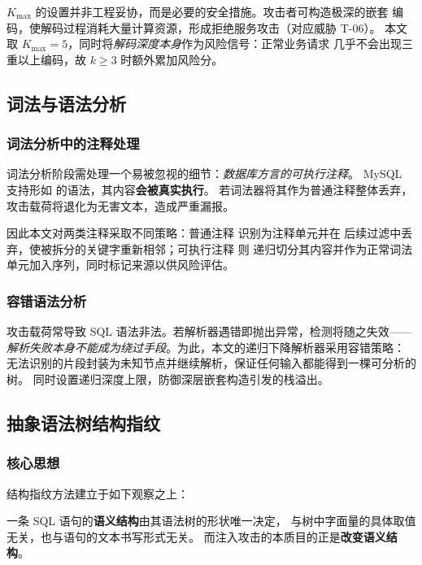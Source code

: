 \begin{remark}[解码深度上限的必要性]
$K_{\max}$ 的设置并非工程妥协，而是必要的安全措施。攻击者可构造极深的嵌套
编码，使解码过程消耗大量计算资源，形成拒绝服务攻击（对应威胁 T-06）。
本文取 $K_{\max} = 5$，同时将\emph{解码深度本身}作为风险信号：正常业务请求
几乎不会出现三重以上编码，故 $k \geq 3$ 时额外累加风险分。
\end{remark}

\subsection{词法与语法分析}
\label{subsec:parsing}

\subsubsection{词法分析中的注释处理}

词法分析阶段需处理一个易被忽视的细节：\emph{数据库方言的可执行注释}。
MySQL 支持形如  的语法，其内容\textbf{会被真实执行}。
若词法器将其作为普通注释整体丢弃，攻击载荷将退化为无害文本，造成严重漏报。

因此本文对两类注释采取不同策略：普通注释  识别为注释单元并在
后续过滤中丢弃，使被拆分的关键字重新相邻；可执行注释  则
递归切分其内容并作为正常词法单元加入序列，同时标记来源以供风险评估。

\subsubsection{容错语法分析}

攻击载荷常导致 SQL 语法非法。若解析器遇错即抛出异常，检测将随之失效——
\emph{解析失败本身不能成为绕过手段}。为此，本文的递归下降解析器采用容错策略：
无法识别的片段封装为未知节点并继续解析，保证任何输入都能得到一棵可分析的树。
同时设置递归深度上限，防御深层嵌套构造引发的栈溢出。

\subsection{抽象语法树结构指纹}
\label{subsec:fingerprint}

\subsubsection{核心思想}

结构指纹方法建立于如下观察之上：

\begin{keybox}
一条 SQL 语句的\textbf{语义结构}由其语法树的形状唯一决定，
与树中字面量的具体取值无关，也与语句的文本书写形式无关。
而注入攻击的本质目的正是\textbf{改变语义结构}。
\end{keybox}

